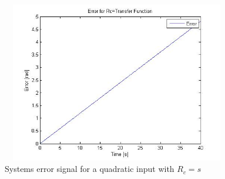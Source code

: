 \documentclass[letterpaper, 11pt, openany]{book}
\begin{document}
\begin{enumerate}
\begin{enumerate}
\begin{figure}[htbp]%
\centering
\includegraphics[width=0.9\textwidth, height = 7cm]{graphics/Quad3Err.jpg} 
\caption{Systems error signal for a quadratic input with $R_c = s$}\label{fig:Quad3Err}
\end{figure}
\end{enumerate}
\end{enumerate}
\end{document}

